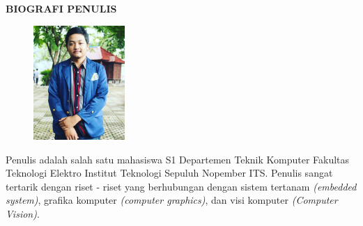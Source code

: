 \begin{center}
\Large\textbf{BIOGRAFI PENULIS}
\end{center}
\vspace{1ex}

\begin{figure}
	\centering
	\vspace{-3ex}	
	\includegraphics[width=0.31\textwidth]{img/Foto.jpg}
	\vspace{-4ex}
\end{figure}
\noindent
Penulis adalah salah satu mahasiswa S1 Departemen Teknik Komputer Fakultas Teknologi Elektro Institut Teknologi Sepuluh Nopember ITS. Penulis sangat tertarik dengan riset - riset yang berhubungan dengan sistem tertanam \textit{(embedded system)}, grafika komputer \textit{(computer graphics)}, dan visi komputer \textit{(Computer Vision)}.